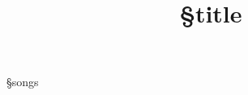 \documentclass[a4paper,11pt]{article}
\title{§title}
\author{}
\date{}
\begin{document}
\maketitle
§songs
\end{document}
